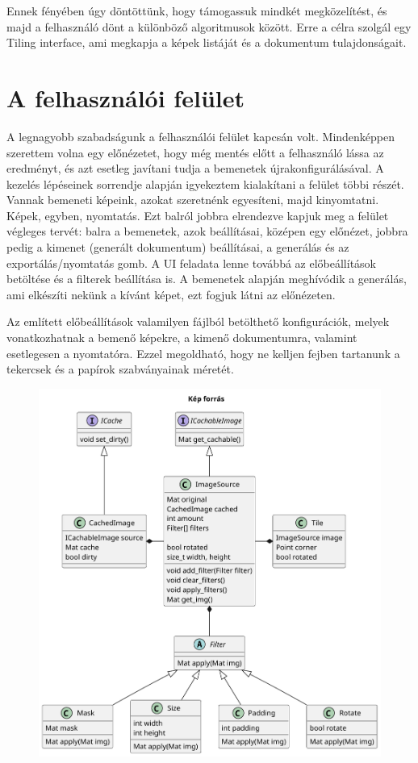 Ennek fényében úgy döntöttünk, hogy támogassuk mindkét megközelítést, és majd a felhasználó dönt a különböző algoritmusok között. Erre a célra szolgál egy Tiling interface, ami megkapja a képek listáját és a dokumentum tulajdonságait.

\section{A felhasználói felület}

A legnagyobb szabadságunk a felhasználói felület kapcsán volt. Mindenképpen szerettem volna egy előnézetet, hogy még mentés előtt a felhasználó lássa az eredményt, és azt esetleg javítani tudja a bemenetek újrakonfigurálásával. A kezelés lépéseinek sorrendje alapján igyekeztem kialakítani a felület többi részét. Vannak bemeneti képeink, azokat szeretnénk egyesíteni, majd kinyomtatni. Képek, egyben, nyomtatás. Ezt balról jobbra elrendezve kapjuk meg a felület végleges tervét: balra a bemenetek, azok beállításai, középen egy előnézet, jobbra pedig a kimenet (generált dokumentum) beállításai, a generálás és az exportálás/nyomtatás gomb. A UI feladata lenne továbbá az előbeállítások betöltése és a filterek beállítása is. A bemenetek alapján meghívódik a generálás, ami elkészíti nekünk a kívánt képet, ezt fogjuk látni az előnézeten.

Az említett előbeállítások valamilyen fájlból betölthető konfigurációk, melyek vonatkozhatnak a bemenő képekre, a kimenő dokumentumra, valamint esetlegesen a nyomtatóra. Ezzel megoldható, hogy ne kelljen fejben tartanunk a tekercsek és a papírok szabványainak méretét.


\begin{figure}
    \centering
    \includegraphics[width=15cm]{figures/uml/img_source.pdf}
    \label{fig:ImageSource_uml}
\end{figure}

